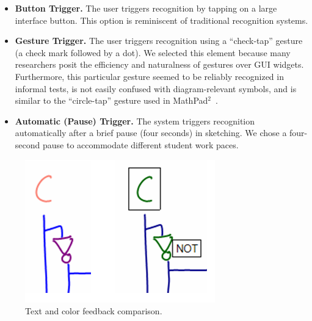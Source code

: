 \documentclass{elsart}
\begin{document}
\begin{itemize}
\item \textbf{Button Trigger.}  The user triggers
recognition by tapping on a large interface button.  This 
option is reminiscent of traditional recognition systems.  
\item \textbf{Gesture Trigger.}  The user triggers
recognition using a ``check-tap'' gesture (a
check mark followed by a dot).  We selected this element because
many researchers posit the efficiency and naturalness of gestures over 
GUI widgets.  Furthermore, this particular gesture seemed to be 
reliably recognized in informal tests, is not easily 
confused with diagram-relevant symbols,
and is similar to the ``circle-tap'' gesture used in
MathPad$^2$~\cite{LaViola2006Initial}.  
\item \textbf{Automatic (Pause) Trigger.}  The system triggers recognition
automatically after a brief pause (four seconds) in sketching.  We chose
a four-second pause to accommodate different student work paces.
\end{itemize}





\begin{figure}[tb]
  \centering
  \includegraphics[width=.65\linewidth]{feedbackDemo.png}
  \caption{\label{fig:feedbackDemo}
           Text and color feedback comparison.}
\end{figure}
\end{document}
